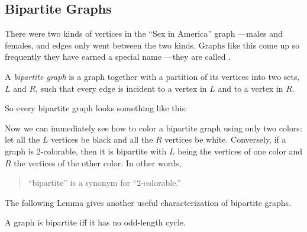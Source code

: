 \begin{problems}

\homeworkproblems
{}


\end{problems}

\label{bipartitesec}

\subsection{Bipartite Graphs}\label{bipartitesubsec}

There were two kinds of vertices in the ``Sex in America'' graph ---males
and females, and edges only went between the two kinds.  Graphs like this
come up so frequently they have earned a special name ---they are called
.

\begin{definition}
A \emph{bipartite graph} is a graph together with a partition of its
vertices into two sets, $L$ and $R$, such that every edge is incident to a
vertex in $L$ and to a vertex in $R$.
\end{definition}

So every bipartite graph looks something like this:


Now we can immediately see how to color a bipartite graph using only two
colors: let all the $L$ vertices be black and all the $R$ vertices be
white.  Conversely, if a graph is 2-colorable, then it is bipartite with
$L$ being the vertices of one color and $R$ the vertices of the other
color.  In other words,
\begin{quote}
``bipartite'' is a synonym for ``2-colorable.''
\end{quote}

The following Lemma gives another useful characterization of bipartite
graphs.
{\begin{theorem}\label{odd-cycle}
A graph is bipartite iff it has no odd-length cycle.
\end{theorem}}

